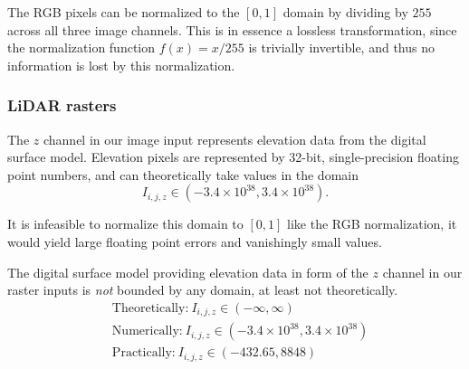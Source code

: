 The RGB pixels can be normalized to the $[0, 1]$ domain by dividing by $255$ across all three image channels.
This is in essence a lossless transformation, since the normalization function $f(x) = x/255$ is trivially invertible, and thus no information is lost by this normalization.

\subsubsection*{LiDAR rasters}

The $z$ channel in our image input represents elevation data from the digital surface model.
Elevation pixels are represented by 32-bit, single-precision floating point numbers, and can theoretically take values in the domain
%
\begin{equation*}
  I_{i,j,z} \in (-3.4 \times 10^{38}, 3.4 \times 10^{38}).
\end{equation*}

\begin{figure}[htb]
  \begin{floatrow}
  \end{floatrow}
\end{figure}

It is infeasible to normalize this domain to $[0, 1]$ like the RGB normalization, it would yield large floating point errors and vanishingly small values.

The digital surface model providing elevation data in form of the $z$ channel in our raster inputs is \textit{not} bounded by any domain, at least not theoretically.
~
\begin{align*}
  &\text{Theoretically:} ~ I_{i,j,z} \in (-\infty, \infty)
  \\
  &\text{Numerically:} ~ I_{i,j,z} \in (-3.4 \times 10^{38}, 3.4 \times 10^{38})
  \\
  &\text{Practically:} ~ I_{i,j,z} \in (-432.65, 8848)
\end{align*}
